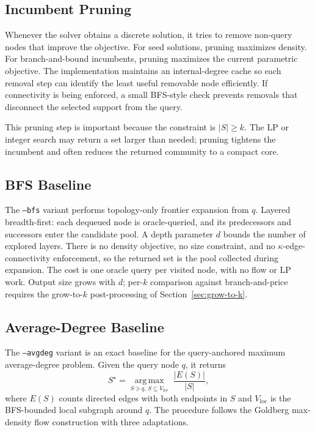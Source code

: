 \documentclass[11pt]{article}
\newcommand{\argmax}{\operatorname*{arg\,max}}
\begin{document}
\subsection{Incumbent Pruning}

Whenever the solver obtains a discrete solution, it tries to remove non-query
nodes that improve the objective. For seed solutions, pruning maximizes density.
For branch-and-bound incumbents, pruning maximizes the current parametric
objective. The implementation maintains an internal-degree cache so each removal
step can identify the least useful removable node efficiently. If connectivity
is being enforced, a small BFS-style check prevents removals that disconnect the
selected support from the query.

This pruning step is important because the constraint is $|S|\geq k$. The LP or
integer search may return a set larger than needed; pruning tightens the
incumbent and often reduces the returned community to a compact core.

\subsection{BFS Baseline}
\label{sec:bfs}

The \texttt{--bfs} variant performs topology-only frontier expansion from
$q$. Layered breadth-first: each dequeued node is oracle-queried, and its
predecessors and successors enter the candidate pool. A depth parameter
$d$ bounds the number of explored layers. There is no density objective,
no size constraint, and no $\kappa$-edge-connectivity enforcement, so the
returned set is the pool collected during expansion. The cost is one
oracle query per visited node, with no flow or LP work. Output size grows
with $d$; per-$k$ comparison against branch-and-price requires the
grow-to-$k$ post-processing of Section~\ref{sec:grow-to-k}.

\subsection{Average-Degree Baseline}
\label{sec:avgdeg}

The \texttt{--avgdeg} variant is an exact baseline for the query-anchored maximum
average-degree problem. Given the query node $q$, it returns
$$
  S^{\star} = \argmax_{S \ni q,\, S \subseteq V_{\mathrm{loc}}}\;
  \frac{|E(S)|}{|S|},
$$
where $E(S)$ counts directed edges with both endpoints in $S$ and
$V_{\mathrm{loc}}$ is the BFS-bounded local subgraph around $q$. The procedure
follows the Goldberg max-density flow construction \cite{goldberg1984} with three
adaptations.
\end{document}
